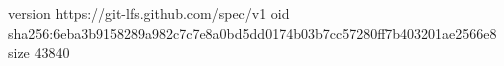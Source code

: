 version https://git-lfs.github.com/spec/v1
oid sha256:6eba3b9158289a982c7c7e8a0bd5dd0174b03b7cc57280ff7b403201ae2566e8
size 43840

